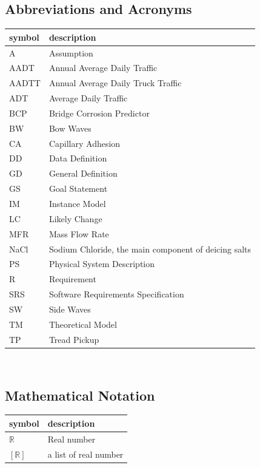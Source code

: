 \documentclass[12pt]{article}
\begin{document}
\subsection{Abbreviations and Acronyms}

\renewcommand{\arraystretch}{1.2}
\begin{tabular}{l l} 
  \toprule		
  \textbf{symbol} & \textbf{description}\\
  \midrule 
A & Assumption\\
AADT & Annual Average Daily Traffic\\
AADTT & Annual Average Daily Truck Traffic\\
ADT & Average Daily Traffic\\
BCP & Bridge Corrosion Predictor \\
BW & Bow Waves\\
CA & Capillary Adhesion\\
DD & Data Definition\\
GD & General Definition\\
GS & Goal Statement\\
IM & Instance Model\\
LC & Likely Change\\
MFR & Mass Flow Rate\\
NaCl & Sodium Chloride, the main component of deicing salts\\
PS & Physical System Description\\
R & Requirement\\
SRS & Software Requirements Specification\\
SW & Side Waves\\
TM & Theoretical Model\\
TP & Tread Pickup\\

  \bottomrule
\end{tabular}\\

\subsection{Mathematical Notation}
\renewcommand{\arraystretch}{1.2}
\begin{tabular}{l l} 
  \toprule		
  \textbf{symbol} & \textbf{description}\\
  \midrule 
  $\mathbb{R}$ & Real number \\
  $[\mathbb{R}]$ & a list of real number\\
  \bottomrule
\end{tabular}\\
\end{document}
